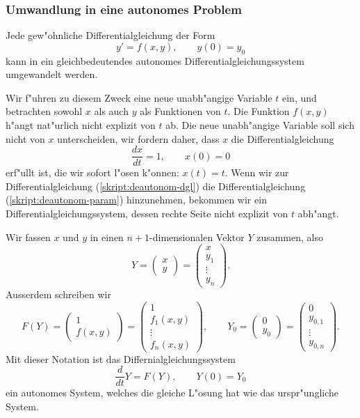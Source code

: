 \subsubsection{Umwandlung in eine autonomes Problem}
Jede gew"ohnliche Differentialgleichung der Form
\begin{equation}
y'=f(x,y), \qquad y(0)=y_0
\label{skript:deautonom-dgl}
\end{equation}
kann in ein gleichbedeutendes autonomes Differentialgleichungssystem
umgewandelt werden.

Wir f"uhren zu diesem Zweck eine neue unabh"angige Variable $t$ ein,
und betrachten sowohl $x$ als auch $y$ als Funktionen von $t$. 
Die Funktion $f(x,y)$ h"angt nat"urlich nicht explizit von $t$ ab.
Die neue unabh"angige Variable soll sich nicht von $x$ unterscheiden,
wir fordern daher, dass $x$ die Differentialgleichung
\begin{equation}
\frac{dx}{dt}=1,\qquad x(0)=0
\label{skript:deautonom-param}
\end{equation}
erf"ullt ist, die wir sofort l"osen k"onnen: $x(t)=t$.
Wenn wir zur Differentialgleichung (\ref{skript:deautonom-dgl}) 
die Differentialgleichung (\ref{skript:deautonom-param}) hinzunehmen,
bekommen wir ein Differentialgleichungssystem, dessen rechte Seite
nicht explizit von  $t$ abh"angt.

Wir fassen $x$ und $y$ in einen $n+1$-dimensionalen Vektor $Y$ zusammen,
also
\[
Y
=
\begin{pmatrix}x\\y\end{pmatrix}
=
\begin{pmatrix}x\\y_1\\\vdots\\y_n\end{pmatrix}.
\]
Ausserdem schreiben wir
\[
F(Y)
=
\begin{pmatrix}1\\f(x,y)\end{pmatrix}
=
\begin{pmatrix}1\\f_1(x,y)\\\vdots\\f_n(x,y)\end{pmatrix},
\qquad
Y_0
=
\begin{pmatrix}0\\y_0\end{pmatrix}
=
\begin{pmatrix}0\\y_{0,1}\\\vdots\\y_{0,n}\end{pmatrix}.
\]
Mit dieser Notation ist das Differnialgleichungssystem
\[
\frac{d}{dt}Y=F(Y),\qquad Y(0)=Y_0
\]
ein autonomes System, welches die gleiche L"osung hat wie das
urspr"ungliche System.

